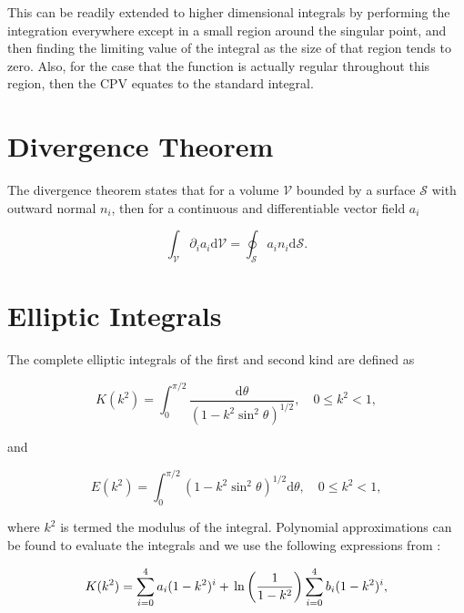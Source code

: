 \documentclass[12pt]{article}
\begin{document}
This can be readily extended to higher dimensional integrals by performing the integration everywhere except in a small region around the singular point, and then finding the limiting value of the integral as the size of that region tends to zero. Also, for the case that the function is actually regular throughout this region, then the CPV equates to the standard integral.


\section{Divergence Theorem}
\label{app:div_theory}

The divergence theorem states that for a volume $\mathcal{V}$ bounded by a surface $\mathcal{S}$ with outward normal $n_{i}$, then for a continuous and differentiable vector field $a_{i}$ \citep{Riley06}

\begin{equation}
\label{equ:div_theory}
\int_{\mathcal{V}} \partial_{i} a_{i} \mathrm{d} \mathcal{V} = \oint_{\mathcal{S}} a_{i} n_{i} \mathrm{d} \mathcal{S}.
\end{equation}

\section{Elliptic Integrals}
\label{app:ellip}

The complete elliptic integrals of the first and second kind are defined as \citep{Abramowitz72}

\begin{equation}
\label{equ:ellip1}
K(k^{2}) = \int_{0}^{\pi/2} \frac{\mathrm{d}\theta}{(1 - k^{2} \sin^{2}\theta)^{1/2}}, \quad 0 \leq k^{2} < 1,
\end{equation}

and

\begin{equation}
\label{equ:ellip2}
E(k^{2}) = \int_{0}^{\pi/2} (1 - k^{2} \sin^{2}\theta)^{1/2} \mathrm{d}\theta, \quad 0 \leq k^{2} < 1,
\end{equation}


where $k^{2}$ is termed the modulus of the integral. Polynomial approximations can be found to evaluate the integrals \citep{Roumeliotis00} and we use the following expressions from \citet{Abramowitz72}:

\begin{equation}
\label{equ:ellip1_app}
K(k^{2}) = \sum_{i = 0}^{4} a_{i} (1 - k^{2})^{i} + \\\ln\left(\frac{1}{1 - k^{2}} \right) \sum_{i = 0}^{4} b_{i} (1 - k^{2})^{i},
\end{equation}
\end{document}
